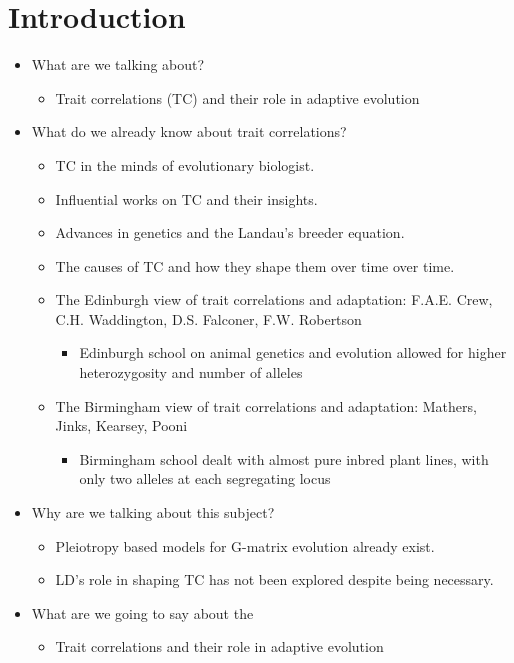 \documentclass[12pt,one column]{article}
\begin{document}
\section*{Introduction}
\begin{itemize}
\item What are we talking about? 
	\begin{itemize}
	\item Trait correlations (TC) and their role in adaptive evolution \cite{Scarcelli23102007,Lovell2013,Wagner2011}
	\end{itemize}
\item What do we already know about trait correlations?
	\begin{itemize}
	\item TC in the minds of evolutionary biologist.
	\item Influential works on TC and their insights. 
	\item Advances in genetics and the Landau's breeder equation.
	\item The causes of TC and how they shape them over time over time.
	\item The Edinburgh view of trait correlations and adaptation: F.A.E. Crew, C.H. Waddington, D.S. Falconer, F.W. Robertson  
	\begin{itemize}
		\item Edinburgh school on animal genetics and evolution allowed for higher heterozygosity and number of alleles
	\end{itemize}
	\item The Birmingham view of trait correlations and adaptation: Mathers, Jinks, Kearsey, Pooni
	\begin{itemize}
		\item Birmingham school dealt with almost pure inbred plant lines, with only two alleles at each segregating locus
	\end{itemize}
	\end{itemize}
\item Why are we talking about this subject?
	\begin{itemize}
	\item Pleiotropy based models for G-matrix evolution already exist.
	\item LD's role in shaping TC has not been explored despite being necessary.
	\end{itemize}
\item What are we going to say about the 
	\begin{itemize}
	\item Trait correlations and their role in adaptive evolution
	\end{itemize}
\end{itemize}
\end{document}
